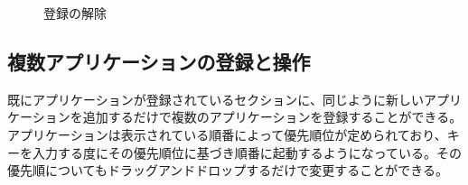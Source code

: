 \begin{figure}[h]
    \begin{center}
    \end{center}
    \caption{登録の解除}
    \label{fig:delete}
\end{figure}

\subsection{複数アプリケーションの登録と操作}
既にアプリケーションが登録されているセクションに、同じように新しいアプリケーションを追加するだけで複数のアプリケーションを登録することができる。アプリケーションは表示されている順番によって優先順位が定められており、キーを入力する度にその優先順位に基づき順番に起動するようになっている。その優先順についてもドラッグアンドドロップするだけで変更することができる。